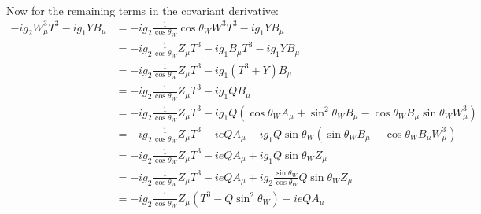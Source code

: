\documentclass[12pt,a4]{article}
\begin{document}
\begin{enumerate}
\begin{enumerate}
\begin{align*}
        \end{align*}
        Now for the remaining terms in the covariant derivative:
        \begin{align*}
          - ig_2  W^3_\mu T^3 - i g_1 Y B_\mu &= -ig_2 \frac{1}{\cos \theta_W }\cos \theta_W W^3T^3 - ig_1 Y B_\mu\\
                                              &= -ig_2 \frac{1}{\cos \theta_W }Z_\mu T^3 - i g_1 B_\mu T^3- ig_1 Y B_\mu\\
                                              &= -ig_2 \frac{1}{\cos \theta_W }Z_\mu T^3 - i g_1 ( T^3 + Y ) B_\mu\\
                                              &= -ig_2 \frac{1}{\cos \theta_W }Z_\mu T^3 - i g_1 Q B_\mu\\
                                              &= -ig_2 \frac{1}{\cos \theta_W }Z_\mu T^3 - i g_1 Q (\cos \theta_W A_\mu + \sin^2 \theta_W B_\mu - \cos \theta_W B_\mu \sin \theta_W W^3_\mu)\\
                                              &= -ig_2 \frac{1}{\cos \theta_W }Z_\mu T^3 - i e Q A_\mu - i g_1 Q \sin \theta_W (\sin \theta_W B_\mu - \cos \theta_W B_\mu  W^3_\mu)\\
                                              &= -ig_2 \frac{1}{\cos \theta_W }Z_\mu T^3 - i e Q A_\mu + i g_1 Q \sin \theta_W Z_\mu\\
                                              &= -ig_2 \frac{1}{\cos \theta_W }Z_\mu T^3 - i e Q A_\mu + i g_2 \frac{\sin \theta_W}{\cos \theta_W} Q \sin \theta_W Z_\mu\\
                                              &= -ig_2 \frac{1}{\cos \theta_W }Z_\mu (T^3 - Q \sin^2 \theta_W) - i e Q A_\mu

\end{align*}
\end{enumerate}
\end{enumerate}
\end{document}

